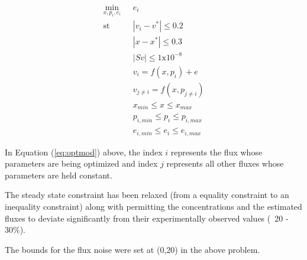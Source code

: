 \documentclass[10pt]{report}
\begin{document}
	\begin{center}
		\begin{subequations}\label{eq:optmod}
			\begin{align}
			\underset{x,p_i,e_i}{\mathrm{min}} & \text{      }e_i\\
			\mathrm{st} & \text{      }|v_i-v^*| \le 0.2\\
			& \text{      }|x-x^*| \le 0.3\\
			& \text{      }|Sv| \le 1\text{x}10^{-8}\\
			& \text{      }v_i = f(x,p_i) + e\\
			& \text{      }v_{j\not= i} = f(x,p_{j\not=i})\\
			& \text{      }x_{min}\le x \le x_{max}\\
			& \text{      }p_{i,min} \le p_i \le p_{i,max}\\
			& \text{      }e_{i,min} \le e_i \le e_{i,max}					
			\end{align}
		\end{subequations}		
	\end{center}
	
	In Equation (\ref{eq:optmod}) above, the index $i$ represents the flux whose parameters are being optimized and index $j$ represents all other fluxes whose parameters are held constant. 
	
	The steady state constraint has been relaxed (from a equality constraint to an inequality constraint) along with permitting the concentrations and the estimated fluxes to deviate significantly from their experimentally observed values (~20 - 30\%). 
	
	The bounds for the flux noise were set at (0,20) in the above problem.
	
\end{document}
